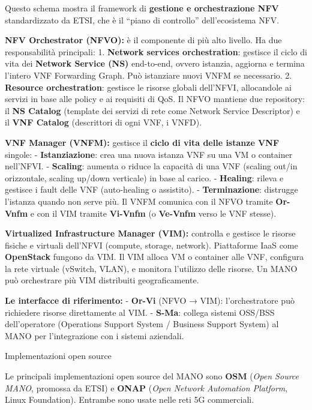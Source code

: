\documentclass[
  italian,
  openany]{book}
\begin{document}
Questo schema mostra il framework di \textbf{gestione e orchestrazione
NFV} standardizzato da ETSI, che è il ``piano di controllo''
dell'ecosistema NFV.

\textbf{NFV Orchestrator (NFVO):} è il componente di più alto livello.
Ha due responsabilità principali: 1. \textbf{Network services
orchestration}: gestisce il ciclo di vita dei \textbf{Network Service
(NS)} end-to-end, ovvero istanzia, aggiorna e termina l'intero VNF
Forwarding Graph. Può istanziare nuovi VNFM se necessario. 2.
\textbf{Resource orchestration}: gestisce le risorse globali dell'NFVI,
allocandole ai servizi in base alle policy e ai requisiti di QoS. Il
NFVO mantiene due repository: il \textbf{NS Catalog} (template dei
servizi di rete come Network Service Descriptor) e il \textbf{VNF
Catalog} (descrittori di ogni VNF, i VNFD).

\textbf{VNF Manager (VNFM):} gestisce il \textbf{ciclo di vita delle
istanze VNF} singole: - \textbf{Istanziazione}: crea una nuova istanza
VNF su una VM o container nell'NFVI. - \textbf{Scaling}: aumenta o
riduce la capacità di una VNF (scaling out/in orizzontale, scaling
up/down verticale) in base al carico. - \textbf{Healing}: rileva e
gestisce i fault delle VNF (auto-healing o assistito). -
\textbf{Terminazione}: distrugge l'istanza quando non serve più. Il VNFM
comunica con il NFVO tramite \textbf{Or-Vnfm} e con il VIM tramite
\textbf{Vi-Vnfm} (o \textbf{Ve-Vnfm} verso le VNF stesse).

\textbf{Virtualized Infrastructure Manager (VIM):} controlla e gestisce
le risorse fisiche e virtuali dell'NFVI (compute, storage, network).
Piattaforme IaaS come \textbf{OpenStack} fungono da VIM. Il VIM alloca
VM o container alle VNF, configura la rete virtuale (vSwitch, VLAN), e
monitora l'utilizzo delle risorse. Un MANO può orchestrare più VIM
distribuiti geograficamente.

\textbf{Le interfacce di riferimento:} - \textbf{Or-Vi} (NFVO → VIM):
l'orchestratore può richiedere risorse direttamente al VIM. -
\textbf{S-Ma}: collega sistemi OSS/BSS dell'operatore (Operations
Support System / Business Support System) al MANO per l'integrazione con
i sistemi aziendali.

\begin{calloutnote}{Implementazioni open source}

Le principali implementazioni open source del MANO sono \textbf{OSM}
(\emph{Open Source MANO}, promossa da ETSI) e \textbf{ONAP} (\emph{Open
Network Automation Platform}, Linux Foundation). Entrambe sono usate
nelle reti 5G commerciali.

\end{calloutnote}
\end{document}
